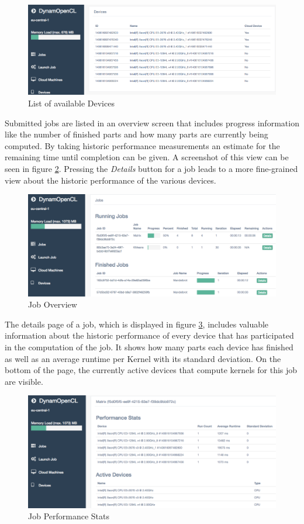 \begin{figure}[!htb]
	\includegraphics[width=1\textwidth]{screenshots/available_devices.png}
	\centering
	\caption{List of available Devices}
	\label{img:available_devices}
\end{figure}

Submitted jobs are listed in an overview screen that includes progress information like the number of finished parts and how many parts are currently being computed. By taking historic performance measurements an estimate for the remaining time until completion can be given. A screenshot of this view can be seen in figure \ref{img:job_overview}. Pressing the \textit{Details} button for a job leads to a more fine-grained view about the historic performance of the various devices.

\begin{figure}[!htb]
	\includegraphics[width=1\textwidth]{screenshots/job_overview.png}
	\centering
	\caption{Job Overview}
	\label{img:job_overview}
\end{figure}

The details page of a job, which is displayed in figure \ref{img:job_details}, includes valuable information about the historic performance of every device that has participated in the computation of the job. It shows how many parts each device has finished as well as an average runtime per Kernel with its standard deviation. On the bottom of the page, the currently active devices that compute kernels for this job are visible.

\begin{figure}[!htb]
	\includegraphics[width=1\textwidth]{screenshots/job_details.png}
	\centering
	\caption{Job Performance Stats}
	\label{img:job_details}
\end{figure}
